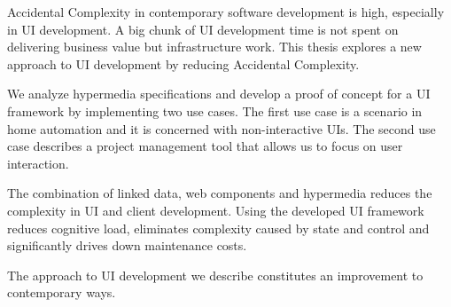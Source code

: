 Accidental Complexity in contemporary software development is high, especially in UI development. A big chunk of UI development time is not spent on delivering business value but infrastructure work. This thesis explores a new approach to UI development by reducing Accidental Complexity.

We analyze \gls{hypermedia} specifications and develop a proof of concept for a UI framework by implementing two use cases. The first use case is a scenario in home automation and it is concerned with non-interactive UIs. The second use case describes a project management tool that allows us to focus on user interaction.

The combination of linked data, web components and hypermedia reduces the complexity in UI and client development. Using the developed UI framework reduces cognitive load, eliminates complexity caused by state and control and significantly drives down maintenance costs.

The approach to UI development we describe constitutes an improvement to contemporary ways.
